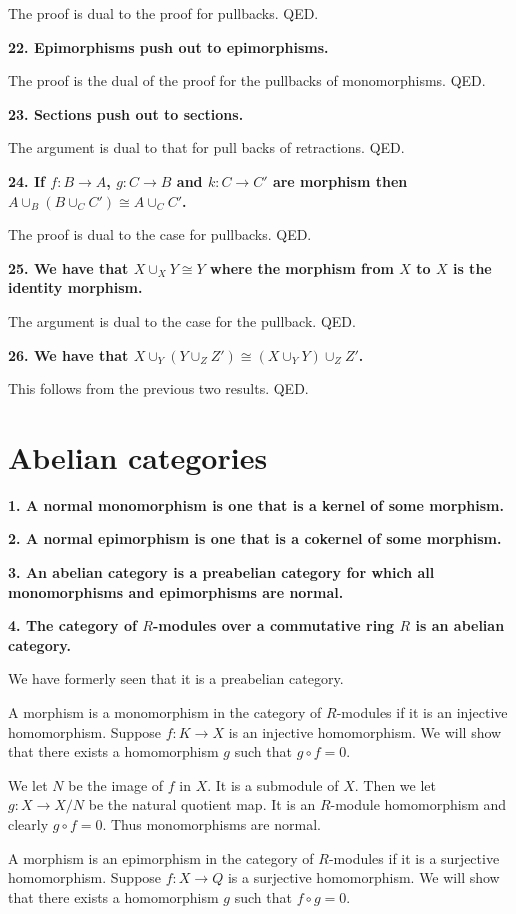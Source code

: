 \documentclass[12pt]{article}
\begin{document}
The proof is dual to the proof for pullbacks. QED.

\textbf{22. Epimorphisms push out to epimorphisms.}

The proof is the dual of the proof for the pullbacks of monomorphisms. QED.

\textbf{23. Sections push out to sections.}

The argument is dual to that for pull backs of retractions. QED.

\textbf{24. If $f : B \to A$, $g : C \to B$ and $k : C \to C'$ are morphism then $A\cup_B (B\cup_C C') \cong A\cup_C C'$.}

The proof is dual to the case for pullbacks. QED.

\textbf{25. We have that $X\cup_X Y \cong Y$ where the morphism from $X$ to $X$ is the identity morphism.}

The argument is dual to the case for the pullback. QED.

\textbf{26. We have that $X\cup_Y(Y\cup_Z Z') \cong (X\cup_Y Y)\cup_Z Z'$.}

This follows from the previous two results. QED.

\section{Abelian categories}

\textbf{1. A normal monomorphism is one that is a kernel of some morphism.}

\textbf{2. A normal epimorphism is one that is a cokernel of some morphism.}

\textbf{3. An abelian category is a preabelian category for which all monomorphisms and epimorphisms are normal.}

\textbf{4. The category of $R$-modules over a commutative ring $R$ is an abelian category.}

We have formerly seen that it is a preabelian category.

A morphism is a monomorphism in the category of $R$-modules if it is an injective homomorphism. Suppose $f : K \to X$ is an injective homomorphism. We will show that there exists a homomorphism $g$ such that $g\circ f = 0$.

We let $N$ be the image of $f$ in $X$. It is a submodule of $X$. Then we let $g : X \to X/N$ be the natural quotient map. It is an $R$-module homomorphism and clearly $g\circ f = 0$. Thus monomorphisms are normal.

A morphism is an epimorphism in the category of $R$-modules if it is a surjective homomorphism. Suppose $f : X \to Q$ is a surjective homomorphism. We will show that there exists a homomorphism $g$ such that $f\circ g = 0$.
\end{document}
